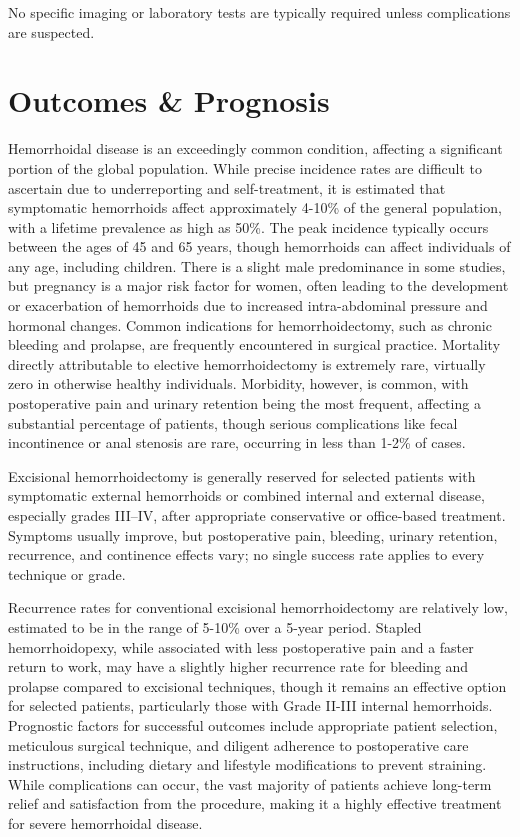 No specific imaging or laboratory tests are typically required unless complications are suspected.

\section*{Outcomes \& Prognosis}
Hemorrhoidal disease is an exceedingly common condition, affecting a significant portion of the global population. While precise incidence rates are difficult to ascertain due to underreporting and self-treatment, it is estimated that symptomatic hemorrhoids affect approximately 4-10\% of the general population, with a lifetime prevalence as high as 50\%. The peak incidence typically occurs between the ages of 45 and 65 years, though hemorrhoids can affect individuals of any age, including children. There is a slight male predominance in some studies, but pregnancy is a major risk factor for women, often leading to the development or exacerbation of hemorrhoids due to increased intra-abdominal pressure and hormonal changes. Common indications for hemorrhoidectomy, such as chronic bleeding and prolapse, are frequently encountered in surgical practice. Mortality directly attributable to elective hemorrhoidectomy is extremely rare, virtually zero in otherwise healthy individuals. Morbidity, however, is common, with postoperative pain and urinary retention being the most frequent, affecting a substantial percentage of patients, though serious complications like fecal incontinence or anal stenosis are rare, occurring in less than 1-2\% of cases.

Excisional hemorrhoidectomy is generally reserved for selected patients with symptomatic external hemorrhoids or combined internal and external disease, especially grades III--IV, after appropriate conservative or office-based treatment. Symptoms usually improve, but postoperative pain, bleeding, urinary retention, recurrence, and continence effects vary; no single success rate applies to every technique or grade.

Recurrence rates for conventional excisional hemorrhoidectomy are relatively low, estimated to be in the range of 5-10\% over a 5-year period. Stapled hemorrhoidopexy, while associated with less postoperative pain and a faster return to work, may have a slightly higher recurrence rate for bleeding and prolapse compared to excisional techniques, though it remains an effective option for selected patients, particularly those with Grade II-III internal hemorrhoids. Prognostic factors for successful outcomes include appropriate patient selection, meticulous surgical technique, and diligent adherence to postoperative care instructions, including dietary and lifestyle modifications to prevent straining. While complications can occur, the vast majority of patients achieve long-term relief and satisfaction from the procedure, making it a highly effective treatment for severe hemorrhoidal disease.

